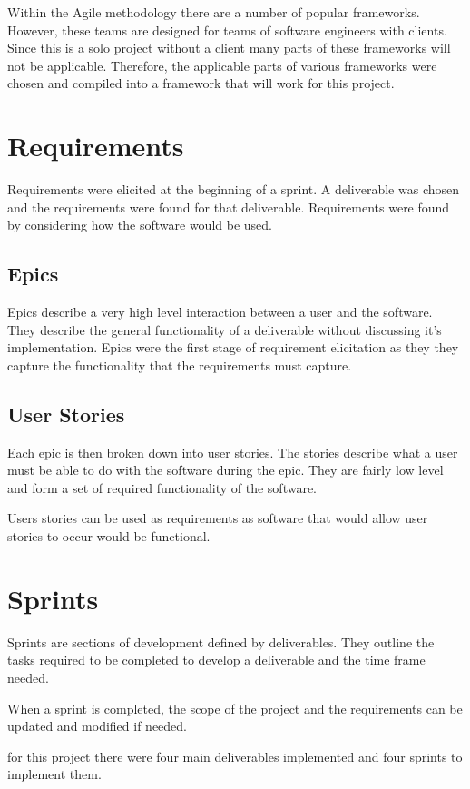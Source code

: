 \documentclass{UoYCSproject}
\begin{document}
Within the Agile methodology there are a number of popular frameworks. However, these teams are designed for teams of software engineers with clients. Since this is a solo project without a client many parts of these frameworks will not be applicable. Therefore, the applicable parts of various frameworks were chosen and compiled into a framework that will work for this project.


\section{Requirements}
Requirements were elicited at the beginning of a sprint. A deliverable was chosen and the requirements were found for that deliverable. Requirements were found by considering how the software would be used.

\subsection{Epics}
Epics describe a very high level interaction between a user and the software. They describe the general functionality of a deliverable without discussing it's implementation. Epics were the first stage of requirement elicitation as they they capture the functionality that the requirements must capture.
\subsection{User Stories}
Each epic is then broken down into user stories. The stories describe what a user must be able to do with the software during the epic. They are fairly low level and form a set of required functionality of the software.

Users stories can be used as requirements as software that would allow user stories to occur would be functional.

\section{Sprints}
Sprints are sections of development defined by deliverables. They outline the tasks required to be completed to develop a deliverable and the time frame needed.

When a sprint is completed, the scope of the project and the requirements can be updated and modified if needed.

for this project there were four main deliverables implemented and four sprints to implement them.\\
\end{document}
